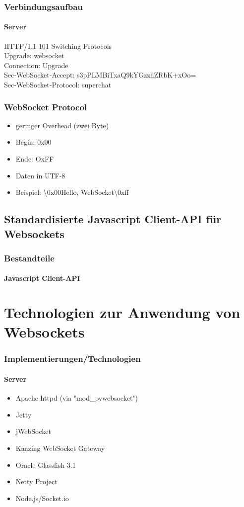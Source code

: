 \documentclass{beamer}
\begin{document}
\begin{frame}
\frametitle{Verbindungsaufbau}
\framesubtitle{Server}
HTTP/1.1 101 Switching Protocols\\
Upgrade: websocket\\
Connection: Upgrade\\
Sec-WebSocket-Accept: s3pPLMBiTxaQ9kYGzzhZRbK+xOo=\\
Sec-WebSocket-Protocol: superchat\\
\end{frame}

\begin{frame}
\frametitle{WebSocket Protocol}
\begin{itemize}
\item geringer Overhead (zwei Byte)
\item Begin: 0x00
\item Ende: OxFF
\item Daten in UTF-8
\item Beispiel: \textbackslash 0x00Hello, WebSocket\textbackslash 0xff
\end{itemize}
\end{frame}

\subsection{Standardisierte Javascript Client-API für Websockets}
\begin{frame}
\frametitle{Bestandteile}
\framesubtitle{Javascript Client-API}
\end{frame}

\section{Technologien zur Anwendung von Websockets}
\begin{frame}
\frametitle{Implementierungen/Technologien}
\framesubtitle{Server}
\begin{itemize}
\item Apache httpd (via "mod\_pywebsocket")
\item Jetty
\item jWebSocket
\item Kaazing WebSocket Gateway
\item Oracle Glassfish 3.1
\item Netty Project
\item Node.js/Socket.io
\end{itemize}
\end{frame}
\end{document}
